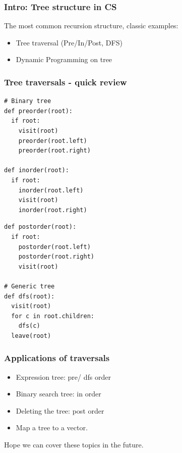 \documentclass{beamer}
\begin{document}
\begin{frame}
  \frametitle{Intro: Tree structure in CS}
The most common recursion structure, classic examples:
\begin{itemize}
  \item Tree traversal (Pre/In/Post, DFS)
  \item Dynamic Programming on tree
\end{itemize}
\end{frame}

\begin{frame}[fragile]
  \frametitle{Tree traversals - quick review}
\begin{minipage}{.5\textwidth}
\begin{verbatim}
# Binary tree
def preorder(root):
  if root:
    visit(root)
    preorder(root.left)
    preorder(root.right)

def inorder(root):
  if root:
    inorder(root.left)
    visit(root)
    inorder(root.right)
\end{verbatim}
\end{minipage}%
\begin{minipage}{.5\textwidth}
\vspace{-2mm}
\begin{verbatim}
def postorder(root):
  if root:
    postorder(root.left)
    postorder(root.right)
    visit(root)

# Generic tree
def dfs(root):
  visit(root)
  for c in root.children:
    dfs(c)
  leave(root)
\end{verbatim}  
\end{minipage}
\end{frame}

\begin{frame}
  \frametitle{Applications of traversals}
\begin{itemize}
  \item <1-> Expression tree: pre/ dfs order
  \item <2-> Binary search tree: in order
  \item <3-> Deleting the tree: post order
  \item <4-> Map a tree to a vector. 
\end{itemize}

 {Hope we can cover these topics in the future.}
\end{frame}
\end{document}
